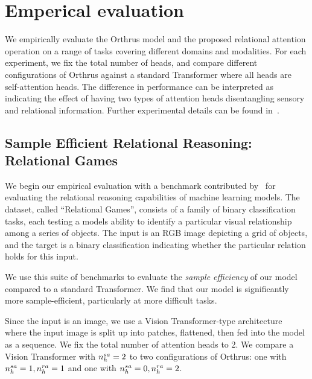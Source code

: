 \section{Emperical evaluation}\label{sec:experiments}

We empirically evaluate the Orthrus model and the proposed relational attention operation on a range of tasks covering different domains and modalities. For each experiment, we fix the total number of heads, and compare different configurations of Orthrus against a standard Transformer where all heads are self-attention heads. The difference in performance can be interpreted as indicating the effect of having two types of attention heads disentangling sensory and relational information. Further experimental details can be found in~.

\subsection{Sample Efficient Relational Reasoning: Relational Games}\label{ssec:relgames}

We begin our empirical evaluation with a benchmark contributed by~\citet{shanahanExplicitlyRelationalNeurala} for evaluating the relational reasoning capabilities of machine learning models. The dataset, called ``Relational Games'', consists of a family of binary classification tasks, each testing a models ability to identify a particular visual relationship among a series of objects. The input is an RGB image depicting a grid of objects, and the target is a binary classification indicating whether the particular relation holds for this input.

We use this suite of benchmarks to evaluate the \textit{sample efficiency} of our model compared to a standard Transformer. We find that our model is significantly more sample-efficient, particularly at more difficult tasks. %

Since the input is an image, we use a Vision Transformer-type architecture~\citep{dosovitskiyImageWorth16x162020} where the input image is split up into patches, flattened, then fed into the model as a sequence. We fix the total number of attention heads to 2. We compare a Vision Transformer with $n_h^{sa} = 2$ to two configurations of Orthrus: one with $n_h^{sa} = 1, n_h^{ra} = 1$ and one with $n_h^{sa} = 0, n_h^{ra} = 2$.

